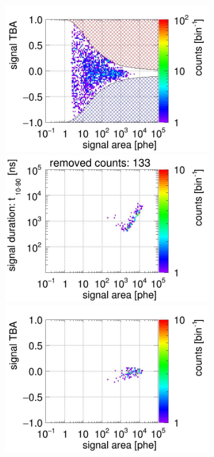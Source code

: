 \begin{landscape}
\begin{figure}[!p]
\begin{subfigure}[t]{0.32\textwidth}
		\includegraphics[width=\figurewidth,clip,trim={0 98 0 40}]{Figures/GasTest/CutsValid/res64767/tbapa12Vecfig64767.jpg}
		\includegraphics[width=\figurewidth,clip,trim={0 98 0 15}]{Figures/GasTest/CutsValid/res64767/pdpaX12Vecfig64767.jpg}
		\includegraphics[width=\figurewidth,clip,trim={0 8 0 40}]{Figures/GasTest/CutsValid/res64767/tbapaX12Vecfig64767.jpg}

\end{subfigure}
\end{figure}
\end{landscape}
